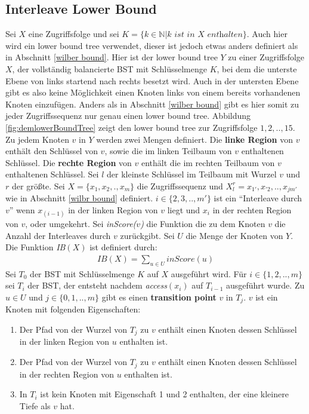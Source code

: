 \documentclass[a4paper,12pt]{article}
\begin{document}
\subsection{Interleave Lower Bound}
  Sei $X$ eine Zugriffsfolge und sei $K = \{k \in \mathbb{N} \vert k \textit{ ist in X enthalten}\}$. Auch hier wird ein lower bound tree verwendet, dieser ist jedoch etwas anders definiert als in Abschnitt \ref{wilber bound}. Hier ist der lower bound tree $Y$ zu einer Zugriffsfolge $X$, der vollständig balancierte BST mit Schlüsselmenge $K$, bei dem die unterste Ebene von links startend nach rechts besetzt wird. Auch in der untersten Ebene gibt es also keine Möglichkeit einen Knoten links von einem bereits vorhandenen Knoten einzufügen. Anders als in Abschnitt \ref{wilber bound}  gibt es hier somit zu jeder Zugriffssequenz nur genau einen lower bound tree. Abbildung \ref{fig:demlowerBoundTree} zeigt den lower bound tree zur Zugriffsfolge $1, 2,.., 15$. Zu jedem Knoten $v$ in $Y$ werden zwei Mengen definiert. Die \textbf{linke Region} von $v$ enthält den Schlüssel von $v$, sowie die im linken Teilbaum von $v$ enthaltenen Schlüssel.  Die \textbf{rechte Region} von $v$ enthält die im rechten Teilbaum von $v$ enthaltenen Schlüssel. Sei $l$ der kleinste Schlüssel im Teilbaum mit Wurzel $v$ und $r$ der größte. Sei $X = \{x_1,x_2,.,x_m\}$ die Zugriffssequenz und $X^r_l = {x_{1'},x_{'2},..,x_{jm'}}$ wie in Abschnitt \ref{wilbr bound} definiert. $i \in \{2,3,..,m'\}$ ist ein \enquote{Interleave durch $v$} wenn $x_{\left(i -1\right)}$ in der linken Region von $v$ liegt und $x_i$ in der rechten Region von $v$, oder umgekehrt. Sei \textit{inScore($v$)} die Funktion die zu dem Knoten $v$ die Anzahl der Interleaves durch $v$ zurückgibt. Sei $U$ die Menge der Knoten von $Y$. Die Funktion \textit{IB$\left(X\right)$} ist definiert durch:
\begin{align*}
\mathit{IB}\left(X\right) = \sum_{u \in U} \mathit{inScore}\left(u\right)
\end{align*}
Sei $T_0$ der BST mit Schlüsselmenge $K$ auf $X$ ausgeführt wird. Für $i \in \{1,2,..,m\}$ sei $T_i$ der BST, der entsteht nachdem \textit{access}$\left(x_i\right)$ auf $T_{i-1}$ ausgeführt wurde. Zu $u \in U$ und  $j \in \{0,1,..,m\}$ gibt es einen \textbf{transition point} $v$ in $T_j$. $v$ ist ein Knoten mit folgenden Eigenschaften:\\
\begin{enumerate}
	\item Der Pfad von der Wurzel von $T_j$ zu $v$ enthält einen Knoten dessen Schlüssel in der linken Region von $u$ enthalten ist.
	\item Der Pfad von der Wurzel von $T_j$ zu $v$ enthält einen Knoten dessen Schlüssel in der rechten Region von $u$ enthalten ist.
	\item In $T_i$ ist kein Knoten mit Eigenschaft 1 und 2 enthalten, der eine kleinere Tiefe als $v$ hat. 
\end{enumerate}
\end{document}
